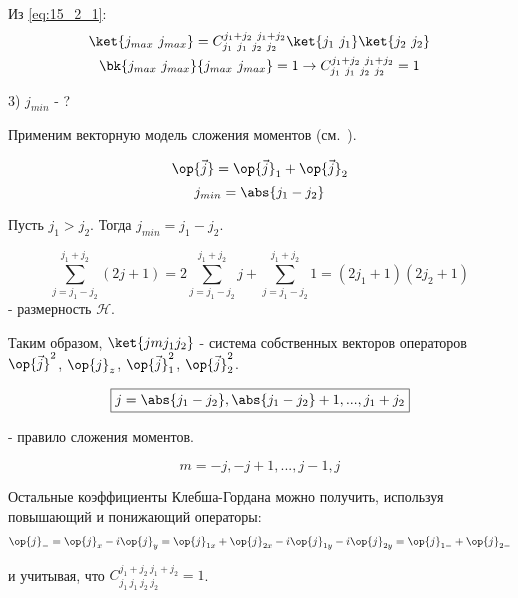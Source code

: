 Из \eqref{eq:15_2_1}:
\begin{gather*}
\ket{j_{max}~j_{max}} = C^{j_1+j_2~j_1 + j_2}_{j_1~j_1~j_2~j_2} \ket{j_1~j_1}\ket{j_2~j_2} \\
\bk{j_{max}~j_{max}}{j_{max}~j_{max}} = 1 \to C^{j_1+j_2~j_1 + j_2}_{j_1~j_1~j_2~j_2} = 1
\end{gather*} 

3) $j_{min}$ - ?

Применим векторную модель сложения моментов (см.~).

$$
\op{\vec{j}} = \op{\vec{j}}_1 + \op{\vec{j}}_2
$$
$$
j_{min} = \abs{j_1 - j_2}
$$

Пусть $j_1 > j_2$. Тогда $j_{min} = j_1 - j_2$.

$$
\sum_{j = j_1 - j_2}^{j_1 + j_2} (2j + 1) = 2 \sum_{j = j_1 - j_2}^{j_1 + j_2} j + \sum_{j = j_1 - j_2}^{j_1 + j_2} 1 = (2j_1 + 1)(2j_2 + 1)
$$
 - размерность $\mathcal{H}$. 
 
Таким образом, $\ket{j m j_1 j_2}$ - система собственных векторов операторов $\op{\vec{j}}^2$, $\op{j}_z$, $\op{\vec{j}}_1^2$, $\op{\vec{j}}_2^2$. 

\begin{equation}
\label{eq:15_2_4}
\boxed{j = \abs{j_1 - j_2}, \abs{j_1 - j_2} + 1, ..., j_1 + j_2}
\end{equation}

- правило сложения моментов.

$$
m = -j, -j + 1, ..., j -1, j
$$

Остальные коэффициенты Клебша-Гордана можно получить, используя повышающий и понижающий операторы:
\begin{gather*}
\op{j}_- = \op{j}_x - i \op{j}_y = \op{j}_{1x} + \op{j}_{2x} - i \op{j}_{1y} -i\op{j}_{2y} = \op{j}_{1-} + \op{j}_{2-}
\end{gather*}

и учитывая, что $C^{j_1+j_2~j_1 + j_2}_{j_1~j_1~j_2~j_2} = 1$.